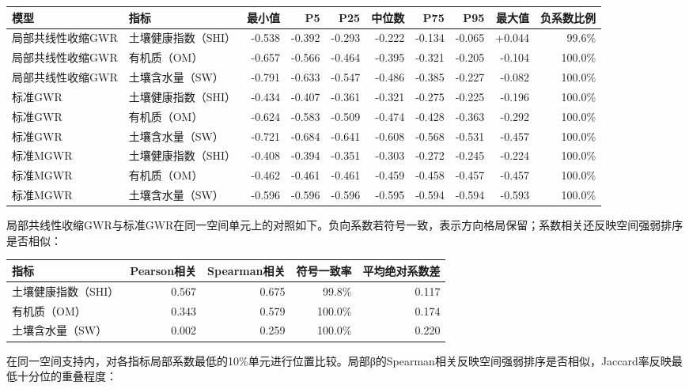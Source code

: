 \documentclass[
  a4paper,
  12pt]{ctexart}
\begin{document}
\begin{longtable}[]{@{}llrrrrrrrr@{}}
\toprule
模型 & 指标 & 最小值 & P5 & P25 & 中位数 & P75 & P95 & 最大值 &
负系数比例 \\
\midrule
\endhead
局部共线性收缩GWR & 土壤健康指数（SHI） & -0.538 & -0.392 & -0.293 &
-0.222 & -0.134 & -0.065 & +0.044 & 99.6\% \\
局部共线性收缩GWR & 有机质（OM） & -0.657 & -0.566 & -0.464 & -0.395 &
-0.321 & -0.205 & -0.104 & 100.0\% \\
局部共线性收缩GWR & 土壤含水量（SW） & -0.791 & -0.633 & -0.547 & -0.486
& -0.385 & -0.227 & -0.082 & 100.0\% \\
标准GWR & 土壤健康指数（SHI） & -0.434 & -0.407 & -0.361 & -0.321 &
-0.275 & -0.225 & -0.196 & 100.0\% \\
标准GWR & 有机质（OM） & -0.624 & -0.583 & -0.509 & -0.474 & -0.428 &
-0.363 & -0.292 & 100.0\% \\
标准GWR & 土壤含水量（SW） & -0.721 & -0.684 & -0.641 & -0.608 & -0.568
& -0.531 & -0.457 & 100.0\% \\
标准MGWR & 土壤健康指数（SHI） & -0.408 & -0.394 & -0.351 & -0.303 &
-0.272 & -0.245 & -0.224 & 100.0\% \\
标准MGWR & 有机质（OM） & -0.462 & -0.461 & -0.461 & -0.459 & -0.458 &
-0.457 & -0.457 & 100.0\% \\
标准MGWR & 土壤含水量（SW） & -0.596 & -0.596 & -0.596 & -0.595 & -0.594
& -0.594 & -0.593 & 100.0\% \\
\bottomrule
\end{longtable}

局部共线性收缩GWR与标准GWR在同一空间单元上的对照如下。负向系数若符号一致，表示方向格局保留；系数相关还反映空间强弱排序是否相似：

\begin{longtable}[]{@{}lrrrr@{}}
\toprule
指标 & Pearson相关 & Spearman相关 & 符号一致率 & 平均绝对系数差 \\
\midrule
\endhead
土壤健康指数（SHI） & 0.567 & 0.675 & 99.8\% & 0.117 \\
有机质（OM） & 0.343 & 0.579 & 100.0\% & 0.174 \\
土壤含水量（SW） & 0.002 & 0.259 & 100.0\% & 0.220 \\
\bottomrule
\end{longtable}

在同一空间支持内，对各指标局部系数最低的10\%单元进行位置比较。局部β的Spearman相关反映空间强弱排序是否相似，Jaccard率反映最低十分位的重叠程度：
\end{document}

